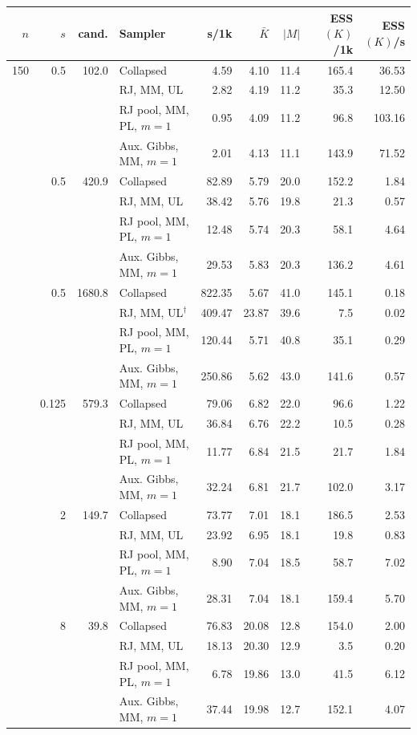 \begin{tabular}{rrr l rrrrr}
\toprule
$n$ & $s$ & cand. & Sampler & s/1k & $\bar K$ & $|M|$ & ESS$(K)$/1k & ESS$(K)$/s \\
\midrule
150 & 0.5 & 102.0 & Collapsed & 4.59 & 4.10 & 11.4 & 165.4 & 36.53 \\
 & &  & RJ, MM, UL & 2.82 & 4.19 & 11.2 & 35.3 & 12.50 \\
 & &  & RJ pool, MM, PL, $m{=}1$ & 0.95 & 4.09 & 11.2 & 96.8 & 103.16 \\
 & &  & Aux. Gibbs, MM, $m{=}1$ & 2.01 & 4.13 & 11.1 & 143.9 & 71.52 \\
\addlinespace
600 & 0.5 & 420.9 & Collapsed & 82.89 & 5.79 & 20.0 & 152.2 & 1.84 \\
 & &  & RJ, MM, UL & 38.42 & 5.76 & 19.8 & 21.3 & 0.57 \\
 & &  & RJ pool, MM, PL, $m{=}1$ & 12.48 & 5.74 & 20.3 & 58.1 & 4.64 \\
 & &  & Aux. Gibbs, MM, $m{=}1$ & 29.53 & 5.83 & 20.3 & 136.2 & 4.61 \\
\addlinespace
2400 & 0.5 & 1680.8 & Collapsed & 822.35 & 5.67 & 41.0 & 145.1 & 0.18 \\
 & &  & RJ, MM, UL$^\dagger$ & 409.47 & 23.87 & 39.6 & 7.5 & 0.02 \\
 & &  & RJ pool, MM, PL, $m{=}1$ & 120.44 & 5.71 & 40.8 & 35.1 & 0.29 \\
 & &  & Aux. Gibbs, MM, $m{=}1$ & 250.86 & 5.62 & 43.0 & 141.6 & 0.57 \\
\addlinespace
600 & 0.125 & 579.3 & Collapsed & 79.06 & 6.82 & 22.0 & 96.6 & 1.22 \\
 & &  & RJ, MM, UL & 36.84 & 6.76 & 22.2 & 10.5 & 0.28 \\
 & &  & RJ pool, MM, PL, $m{=}1$ & 11.77 & 6.84 & 21.5 & 21.7 & 1.84 \\
 & &  & Aux. Gibbs, MM, $m{=}1$ & 32.24 & 6.81 & 21.7 & 102.0 & 3.17 \\
\addlinespace
600 & 2 & 149.7 & Collapsed & 73.77 & 7.01 & 18.1 & 186.5 & 2.53 \\
 & &  & RJ, MM, UL & 23.92 & 6.95 & 18.1 & 19.8 & 0.83 \\
 & &  & RJ pool, MM, PL, $m{=}1$ & 8.90 & 7.04 & 18.5 & 58.7 & 7.02 \\
 & &  & Aux. Gibbs, MM, $m{=}1$ & 28.31 & 7.04 & 18.1 & 159.4 & 5.70 \\
\addlinespace
600 & 8 & 39.8 & Collapsed & 76.83 & 20.08 & 12.8 & 154.0 & 2.00 \\
 & &  & RJ, MM, UL & 18.13 & 20.30 & 12.9 & 3.5 & 0.20 \\
 & &  & RJ pool, MM, PL, $m{=}1$ & 6.78 & 19.86 & 13.0 & 41.5 & 6.12 \\
 & &  & Aux. Gibbs, MM, $m{=}1$ & 37.44 & 19.98 & 12.7 & 152.1 & 4.07 \\
\bottomrule
\end{tabular}
